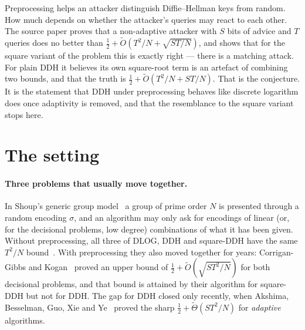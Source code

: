 \documentclass{conjura-conjecture}
\newcommand{\Ot}{\widetilde{O}}
\newcommand{\Th}{\widetilde{\Theta}}
\begin{document}

\vspace{0.4em}

\begin{informalconjecture}
Preprocessing helps an attacker distinguish Diffie--Hellman keys from
random. How much depends on whether the attacker's queries may react to
each other. The source paper proves that a non-adaptive attacker with
$S$ bits of advice and $T$ queries does no better than
$\tfrac{1}{2} + \Ot(T^{2}/N + \sqrt{ST/N})$, and shows that for the
square variant of the problem this is exactly right --- there is a
matching attack. For plain DDH it believes its own square-root term is
an artefact of combining two bounds, and that the truth is
$\tfrac{1}{2} + \Ot(T^{2}/N + ST/N)$. That is the conjecture. It is the
statement that DDH under preprocessing behaves like discrete logarithm
does once adaptivity is removed, and that the resemblance to the square
variant stops here.
\end{informalconjecture}

\section{The setting}\label{sec:setting}

\paragraph{Three problems that usually move together.}
In Shoup's generic group model~\cite{Sho97} a group of prime order $N$
is presented through a random encoding $\sigma$, and an algorithm may
only ask for encodings of linear (or, for the decisional problems, low
degree) combinations of what it has been given. Without preprocessing,
all three of DLOG, DDH and square-DDH have the same $T^{2}/N$
bound~\cite{Sho97,CDG18}. With preprocessing they also moved together
for years: Corrigan-Gibbs and Kogan~\cite{CK18} proved an upper bound of
$\tfrac{1}{2} + \Ot(\sqrt{ST^{2}/N})$ for both decisional problems, and
that bound is attained by their algorithm for square-DDH but not for
DDH\@. The gap for DDH closed only recently, when Akshima, Besselman,
Guo, Xie and Ye~\cite{ABGXY24} proved the sharp
$\tfrac{1}{2} + \Th(ST^{2}/N)$ for \emph{adaptive} algorithms.
\end{document}

